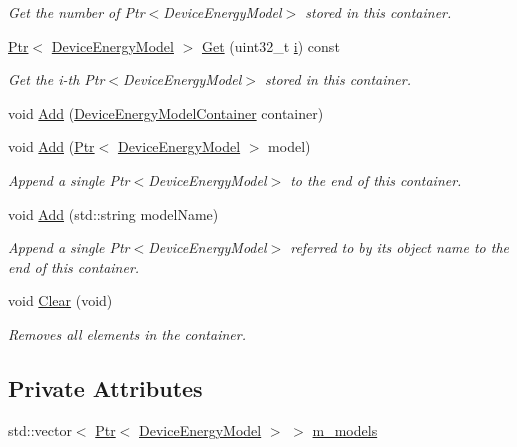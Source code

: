 \begin{DoxyCompactItemize}
\begin{DoxyCompactList}\small\item\em Get the number of Ptr$<$\+Device\+Energy\+Model$>$ stored in this container. \end{DoxyCompactList}\item 
\hyperlink{classns3_1_1Ptr}{Ptr}$<$ \hyperlink{classns3_1_1DeviceEnergyModel}{Device\+Energy\+Model} $>$ \hyperlink{classns3_1_1DeviceEnergyModelContainer_ab7b49acea017b91801a4e7067db56eba}{Get} (uint32\+\_\+t \hyperlink{lte__uplink__power__control_8m_a6f6ccfcf58b31cb6412107d9d5281426}{i}) const 
\begin{DoxyCompactList}\small\item\em Get the i-\/th Ptr$<$\+Device\+Energy\+Model$>$ stored in this container. \end{DoxyCompactList}\item 
void \hyperlink{classns3_1_1DeviceEnergyModelContainer_a26b884d9e349f58596eb5596868f0ab0}{Add} (\hyperlink{classns3_1_1DeviceEnergyModelContainer}{Device\+Energy\+Model\+Container} container)
\item 
void \hyperlink{classns3_1_1DeviceEnergyModelContainer_a63f82f7d955dea4e0a4483e97081fef6}{Add} (\hyperlink{classns3_1_1Ptr}{Ptr}$<$ \hyperlink{classns3_1_1DeviceEnergyModel}{Device\+Energy\+Model} $>$ model)
\begin{DoxyCompactList}\small\item\em Append a single Ptr$<$\+Device\+Energy\+Model$>$ to the end of this container. \end{DoxyCompactList}\item 
void \hyperlink{classns3_1_1DeviceEnergyModelContainer_a7a714b7fe7b9ba5a6b28dcde3b005225}{Add} (std\+::string model\+Name)
\begin{DoxyCompactList}\small\item\em Append a single Ptr$<$\+Device\+Energy\+Model$>$ referred to by its object name to the end of this container. \end{DoxyCompactList}\item 
void \hyperlink{classns3_1_1DeviceEnergyModelContainer_ae7952e38cc6957a941d9d03435db03d3}{Clear} (void)
\begin{DoxyCompactList}\small\item\em Removes all elements in the container. \end{DoxyCompactList}\end{DoxyCompactItemize}
\subsection*{Private Attributes}
\begin{DoxyCompactItemize}
\item 
std\+::vector$<$ \hyperlink{classns3_1_1Ptr}{Ptr}$<$ \hyperlink{classns3_1_1DeviceEnergyModel}{Device\+Energy\+Model} $>$ $>$ \hyperlink{classns3_1_1DeviceEnergyModelContainer_a4dbf51f6369edf048c1072096c9c886f}{m\+\_\+models}
\end{DoxyCompactItemize}


